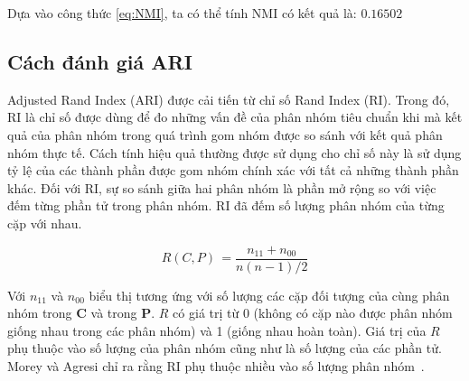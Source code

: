 %
%

Dựa vào công thức \ref{eq:NMI}, ta có thể tính NMI có kết quả là: $0.16502$

		
\subsection{Cách đánh giá ARI}
Adjusted Rand Index (ARI) được cải tiến từ chỉ số Rand Index (RI).
Trong đó, RI là chỉ số được dùng để đo những vấn đề của phân nhóm tiêu chuẩn khi mà kết quả của phân nhóm trong quá trình gom nhóm được so sánh với kết quả phân nhóm thực tế.
Cách tính hiệu quả thường được sử dụng cho chỉ số này là sử dụng tỷ lệ của các thành phần được gom nhóm chính xác với tất cả những thành phần khác.
Đối với RI, sự so sánh giữa hai phân nhóm là phần mở rộng so với việc đếm từng phần tử trong phân nhóm.
RI đã đếm số lượng phân nhóm của từng cặp với nhau.
\begin{center}
\begin{equation}
R(C,P) \, = \frac{n_{11} + n_{00}}{n(n - 1) / 2}
\end{equation}
\end{center}

Với $n_{11}$ và $n_{00}$ biểu thị tương ứng với số lượng các cặp đối tượng của cùng phân nhóm trong $\textbf{C}$ và trong $\textbf{P}$.
$R$ có giá trị từ 0 (không có cặp nào được phân nhóm giống nhau trong các phân nhóm) và 1 (giống nhau hoàn toàn).
Giá trị của $R$ phụ thuộc vào số lượng của phân nhóm cũng như là số lượng của các phần tử.
Morey và Agresi chỉ ra rằng RI phụ thuộc nhiều vào số lượng phân nhóm~\cite{Morey-Agresti}.

